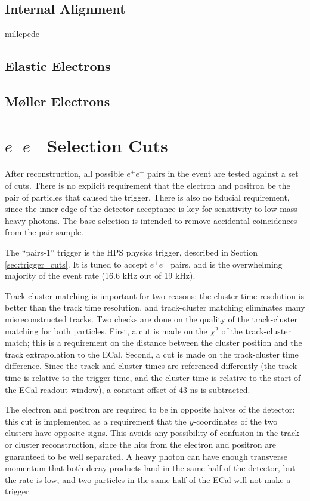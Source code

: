 \subsection{Internal Alignment}
millepede
\subsection{Elastic Electrons}
\label{sec:target_z}
\subsection{M{\o}ller Electrons}
\label{sec:mollers}

\section{\texorpdfstring{$e^+e^-$}{e+e-} Selection Cuts}
\label{sec:event_selection}
After reconstruction, all possible $e^+e^-$ pairs in the event are tested against a set of cuts.
There is no explicit requirement that the electron and positron be the pair of particles that caused the trigger.
There is also no fiducial requirement, since the inner edge of the detector acceptance is key for sensitivity to low-mass heavy photons.
The base selection is intended to remove accidental coincidences from the pair sample.

The ``pairs-1'' trigger is the HPS physics trigger, described in Section \ref{sec:trigger_cuts}.
It is tuned to accept $e^+e^-$ pairs, and is the overwhelming majority of the event rate (16.6 kHz out of 19 kHz).

Track-cluster matching is important for two reasons: the cluster time resolution is better than the track time resolution, and track-cluster matching eliminates many misreconstructed tracks.
Two checks are done on the quality of the track-cluster matching for both particles.
First, a cut is made on the $\chi^2$ of the track-cluster match; this is a requirement on the distance between the cluster position and the track extrapolation to the ECal.
Second, a cut is made on the track-cluster time difference.
Since the track and cluster times are referenced differently (the track time is relative to the trigger time, and the cluster time is relative to the start of the ECal readout window), a constant offset of 43 ns is subtracted.

The electron and positron are required to be in opposite halves of the detector: this cut is implemented as a requirement that the $y$-coordinates of the two clusters have opposite signs.
This avoids any possibility of confusion in the track or cluster reconstruction, since the hits from the electron and positron are guaranteed to be well separated.
A heavy photon can have enough transverse momentum that both decay products land in the same half of the detector, but the rate is low, and two particles in the same half of the ECal will not make a trigger.

